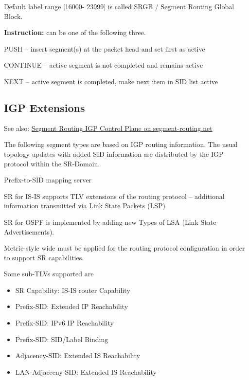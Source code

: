 Default label range [16000- 23999] is called SRGB / Segment Routing Global Block.

\vspace{5mm}
\textbf{Instruction: } can be one of the following three.

\noindent
PUSH -- insert segment(s) at the packet head and set first as active

\noindent
CONTINUE -- active segment is not completed and remains active

\noindent
NEXT -- active segment is completed, make next item in SID list active

\subsection{IGP Extensions}

See also: \href{https://www.segment-routing.net/tutorials/2016-09-27-segment-routing-igp-control-plane/}{Segment Routing IGP Control Plane on segment-routing.net}

\vspace{5mm}
The following segment types are based on IGP routing information. The usual topology updates with added SID information 
are distributed by the IGP protocol within the SR-Domain.

Prefix-to-SID mapping server 

SR for IS-IS supports TLV extensions of the routing protocol -- additional information transmitted via Link State Packets (LSP)

SR for OSPF is implemented by adding new Types of LSA (Link State Advertisements).

\ttfamily Metric-style wide \rmfamily must be applied for the routing protocol configuration in order to support SR capabilities.

\vspace{3mm}
\noindent
Some sub-TLVs supported are

\begin{itemize}
    \item SR Capability: IS-IS router Capability
    \item Prefix-SID: Extended IP Reachability
    \item Prefix-SID: IPv6 IP Reachability
    \item Prefix-SID: SID/Label Binding
    \item Adjacency-SID: Extended IS Reachability
    \item LAN-Adjacecny-SID: Extended IS Reachability
\end{itemize}


